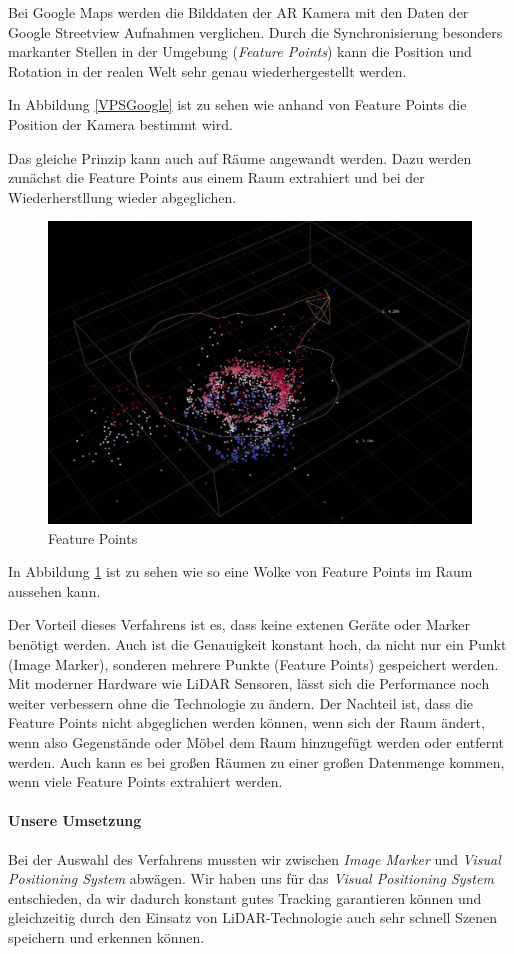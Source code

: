 \documentclass[titlepage, a4paper, 11pt]{scrartcl}
\begin{document}
  Bei Google Maps werden die Bilddaten der AR Kamera mit den Daten der Google Streetview Aufnahmen verglichen.
  Durch die Synchronisierung besonders markanter Stellen in der Umgebung (\textit{Feature Points}) kann die Position und Rotation in der realen Welt sehr genau wiederhergestellt werden.

  In Abbildung \ref{VPSGoogle} ist zu sehen wie anhand von Feature Points die Position der Kamera bestimmt wird.

  Das gleiche Prinzip kann auch auf Räume angewandt werden. Dazu werden zunächst die Feature Points aus einem Raum extrahiert und bei der Wiederherstllung wieder abgeglichen.

  \begin{figure}[h]
    \centering
    \includegraphics[width=.5\textwidth]{arworldmap-featurepoints}
    \caption{Feature Points}
    \label{FeaturePoints}
  \end{figure}

  In Abbildung \ref{FeaturePoints} ist zu sehen wie so eine Wolke von Feature Points im Raum aussehen kann.

  Der Vorteil dieses Verfahrens ist es, dass keine extenen Geräte oder Marker benötigt werden. Auch ist die Genauigkeit konstant hoch, da nicht nur ein Punkt (Image Marker), sonderen mehrere Punkte (Feature Points) gespeichert werden. Mit moderner Hardware wie LiDAR Sensoren, lässt sich die Performance noch weiter verbessern ohne die Technologie zu ändern.
  Der Nachteil ist, dass die Feature Points nicht abgeglichen werden können, wenn sich der Raum ändert, wenn also Gegenstände oder Möbel dem Raum hinzugefügt werden oder entfernt werden.
  Auch kann es bei großen Räumen zu einer großen Datenmenge kommen, wenn viele Feature Points extrahiert werden.

  \paragraph{Unsere Umsetzung}

  Bei der Auswahl des Verfahrens mussten wir zwischen \textit{Image Marker} und \textit{Visual Positioning System} abwägen.
  Wir haben uns für das \textit{Visual Positioning System} entschieden, da wir dadurch konstant gutes Tracking garantieren können und
  gleichzeitig durch den Einsatz von LiDAR-Technologie auch sehr schnell Szenen speichern und erkennen können.
\end{document}
